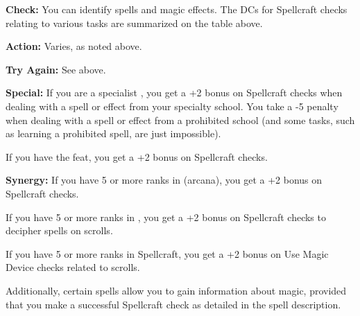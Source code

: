 \textbf{Check:} You can identify spells and magic effects. The DCs for Spellcraft 
checks relating to various tasks are summarized on the table above.

\textbf{Action:} Varies, as noted above.

\textbf{Try Again:} See above.

\textbf{Special:} If you are a specialist , you get a +2 bonus on Spellcraft 
checks when dealing with a spell or effect from your specialty school. You take 
a -5 penalty when dealing with a spell or effect from a prohibited school (and 
some tasks, such as learning a prohibited spell, are just impossible).

If you have the  feat, you get a +2 bonus on Spellcraft checks.

\textbf{Synergy:} If you have 5 or more ranks in  (arcana), you get a 
+2 bonus on Spellcraft checks.

If you have 5 or more ranks in , you get a +2 bonus on Spellcraft 
checks to decipher spells on scrolls.

If you have 5 or more ranks in Spellcraft, you get a +2 bonus on Use Magic Device 
checks related to scrolls.

Additionally, certain spells allow you to gain information about magic, provided 
that you make a successful Spellcraft check as detailed in the spell description.
